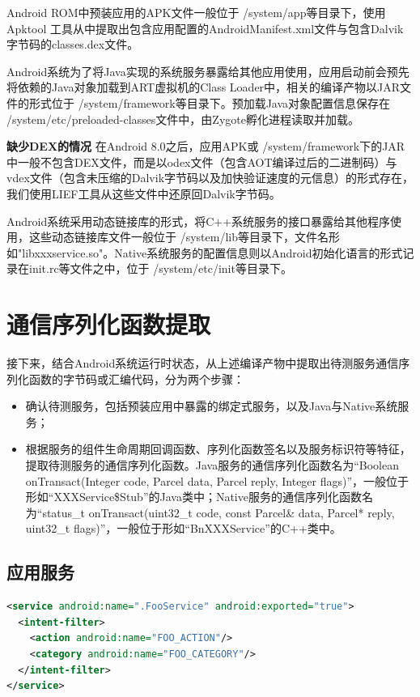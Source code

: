 \documentclass[winfonts,master,twoside]{njuthesis}
\begin{document}
Android ROM中预装应用的APK文件一般位于 /system/app等目录下，使用Apktool \cite{apktool}工具从中提取出包含应用配置的AndroidManifest.xml文件与包含Dalvik字节码的classes.dex文件。

Android系统为了将Java实现的系统服务暴露给其他应用使用，应用启动前会预先将依赖的Java对象加载到ART虚拟机的Class Loader中，相关的编译产物以JAR文件的形式位于 /system/framework等目录下。预加载Java对象配置信息保存在 /system/etc/preloaded-classes文件中，由Zygote孵化进程读取并加载。

\textbf{缺少DEX的情况} \quad 在Android 8.0之后，应用APK或 /system/framework下的JAR中一般不包含DEX文件，而是以odex文件（包含AOT编译过后的二进制码）与vdex文件（包含未压缩的Dalvik字节码以及加快验证速度的元信息）的形式存在，我们使用LIEF工具\cite{lief}从这些文件中还原回Dalvik字节码。

Android系统采用动态链接库的形式，将C++系统服务的接口暴露给其他程序使用，这些动态链接库文件一般位于 /system/lib等目录下，文件名形如"libxxxservice.so"。Native系统服务的配置信息则以Android初始化语言的形式记录在init.rc等文件之中，位于 /system/etc/init等目录下。

\section{通信序列化函数提取}

接下来，结合Android系统运行时状态，从上述编译产物中提取出待测服务通信序列化函数的字节码或汇编代码，分为两个步骤：
\begin{itemize}
	\item 确认待测服务，包括预装应用中暴露的绑定式服务，以及Java与Native系统服务；
	\item 根据服务的组件生命周期回调函数、序列化函数签名以及服务标识符等特征，提取待测服务的通信序列化函数。Java服务的通信序列化函数名为“Boolean onTransact(Integer code, Parcel data, Parcel reply, Integer flags)”，一般位于形如“XXXService\$Stub”的Java类中；Native服务的通信序列化函数名为“status\_t onTransact(uint32\_t code, const Parcel\& data, Parcel* reply, uint32\_t flags)”，一般位于形如“BnXXXService”的C++类中。
\end{itemize}

\subsection{应用服务}

\begin{lstlisting}[caption={应用服务的配置文件},label={lst:exorted_service},language=xml] 
<service android:name=".FooService" android:exported="true">
  <intent-filter>
    <action android:name="FOO_ACTION"/>
    <category android:name="FOO_CATEGORY"/>
  </intent-filter>
</service>
\end{lstlisting}
\end{document}
